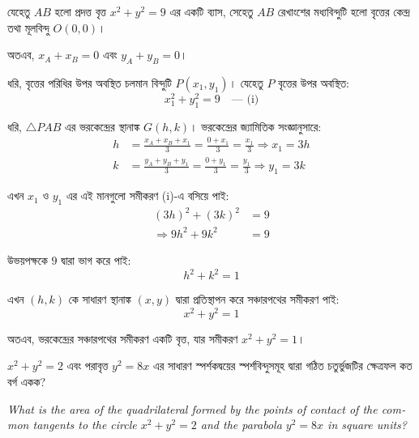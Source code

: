 \documentclass[12pt, a4paper]{article}
\begin{document}
\begin{tcolorbox}[solutionbox={সমাধান (Solution)}]
    \noindent
    যেহেতু $AB$ হলো প্রদত্ত বৃত্ত $x^2 + y^2 = 9$ এর একটি ব্যাস, সেহেতু $AB$ রেখাংশের মধ্যবিন্দুটি হলো বৃত্তের কেন্দ্র তথা মূলবিন্দু $O(0, 0)$। 
    
    \vspace{0.5em}
    অতএব, $x_A + x_B = 0$ এবং $y_A + y_B = 0$।
    
    \vspace{0.5em}
    ধরি, বৃত্তের পরিধির উপর অবস্থিত চলমান বিন্দুটি $P(x_1, y_1)$। যেহেতু $P$ বৃত্তের উপর অবস্থিত:
    \[ x_1^2 + y_1^2 = 9 \quad \text{--- (i)} \]
    
    \vspace{0.5em}
    ধরি, $\triangle PAB$ এর ভরকেন্দ্রের স্থানাঙ্ক $G(h, k)$। ভরকেন্দ্রের জ্যামিতিক সংজ্ঞানুসারে:
    \begin{align*}
        h &= \frac{x_A + x_B + x_1}{3} = \frac{0 + x_1}{3} = \frac{x_1}{3} \Rightarrow x_1 = 3h \\
        k &= \frac{y_A + y_B + y_1}{3} = \frac{0 + y_1}{3} = \frac{y_1}{3} \Rightarrow y_1 = 3k
    \end{align*}
    
    \vspace{0.5em}
    এখন $x_1$ ও $y_1$ এর এই মানগুলো সমীকরণ (i)-এ বসিয়ে পাই:
    \begin{align*}
        (3h)^2 + (3k)^2 &= 9 \\
        \Rightarrow 9h^2 + 9k^2 &= 9
    \end{align*}
    
    \vspace{0.5em}
    উভয়পক্ষকে $9$ দ্বারা ভাগ করে পাই:
    \[ h^2 + k^2 = 1 \]
    
    \vspace{0.5em}
    এখন $(h, k)$ কে সাধারণ স্থানাঙ্ক $(x, y)$ দ্বারা প্রতিস্থাপন করে সঞ্চারপথের সমীকরণ পাই:
    \[ x^2 + y^2 = 1 \]
    
    \vspace{0.5em}
    অতএব, ভরকেন্দ্রের সঞ্চারপথের সমীকরণ একটি বৃত্ত, যার সমীকরণ $x^2 + y^2 = 1$।
\end{tcolorbox}

\vspace{2em}

\begin{tcolorbox}[questionbox={প্রশ্ন (Question) 30}]
    \noindent
    $x^2 + y^2 = 2$ এবং পরাবৃত্ত $y^2 = 8x$ এর সাধারণ স্পর্শকদ্বয়ের স্পর্শবিন্দুসমূহ দ্বারা গঠিত চতুর্ভুজটির ক্ষেত্রফল কত বর্গ একক?
    
    \vspace{0.8em}
    \begin{english}
    \noindent\textit{\color{darkgray}
    What is the area of the quadrilateral formed by the points of contact of the common tangents to the circle $x^2 + y^2 = 2$ and the parabola $y^2 = 8x$ in square units?
    }
    \end{english}
\end{tcolorbox}
\end{document}
